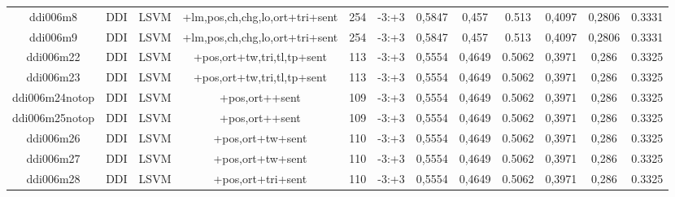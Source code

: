 \documentclass[a4paper]{article}
\begin{document}
\begin{landscape}
\begin{center}
\begin{tabular}{ |c|c|c|c|c|c|c|c|c|c|c|c|}
 
 	
 	\small{ ddi006m8 } & \small{ DDI} & \small{  LSVM }  & +lm,pos,ch,chg,lo,ort+tri+sent  &  254 &  \small{  -3:+3 }  &  0,5847 & 0,457 & 0.513  &  0,4097 & 0,2806 & 0.3331 \\
 	

 
 	
 	\small{ ddi006m9 } & \small{ DDI} & \small{  LSVM }  & +lm,pos,ch,chg,lo,ort+tri+sent  &  254 &  \small{  -3:+3 }  &  0,5847 & 0,457 & 0.513  &  0,4097 & 0,2806 & 0.3331 \\
 	

 
 	
 	\small{ ddi006m22 } & \small{ DDI} & \small{  LSVM }  & +pos,ort+tw,tri,tl,tp+sent  &  113 &  \small{  -3:+3 }  &  0,5554 & 0,4649 & 0.5062  &  0,3971 & 0,286 & 0.3325 \\
 	

 
 	
 	\small{ ddi006m23 } & \small{ DDI} & \small{  LSVM }  & +pos,ort+tw,tri,tl,tp+sent  &  113 &  \small{  -3:+3 }  &  0,5554 & 0,4649 & 0.5062  &  0,3971 & 0,286 & 0.3325 \\
 	

 
 	
 	\small{ ddi006m24notop } & \small{ DDI} & \small{  LSVM }  & +pos,ort++sent  &  109 &  \small{  -3:+3 }  &  0,5554 & 0,4649 & 0.5062  &  0,3971 & 0,286 & 0.3325 \\
 	

 
 	
 	\small{ ddi006m25notop } & \small{ DDI} & \small{  LSVM }  & +pos,ort++sent  &  109 &  \small{  -3:+3 }  &  0,5554 & 0,4649 & 0.5062  &  0,3971 & 0,286 & 0.3325 \\
 	

 
 	
 	\small{ ddi006m26 } & \small{ DDI} & \small{  LSVM }  & +pos,ort+tw+sent  &  110 &  \small{  -3:+3 }  &  0,5554 & 0,4649 & 0.5062  &  0,3971 & 0,286 & 0.3325 \\
 	

 
 	
 	\small{ ddi006m27 } & \small{ DDI} & \small{  LSVM }  & +pos,ort+tw+sent  &  110 &  \small{  -3:+3 }  &  0,5554 & 0,4649 & 0.5062  &  0,3971 & 0,286 & 0.3325 \\
 	

 
 	
 	\small{ ddi006m28 } & \small{ DDI} & \small{  LSVM }  & +pos,ort+tri+sent  &  110 &  \small{  -3:+3 }  &  0,5554 & 0,4649 & 0.5062  &  0,3971 & 0,286 & 0.3325 \\
 	


\end{tabular}
\end{center}
\end{landscape}
\end{document}
